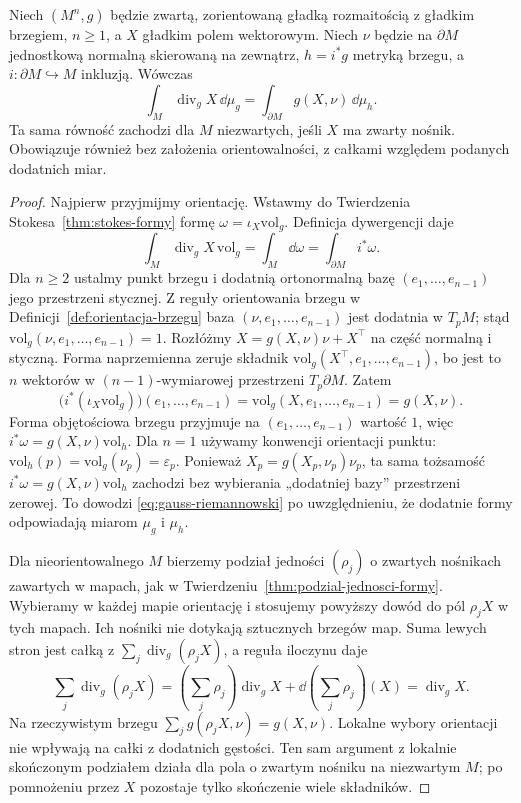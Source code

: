 \begin{twierdzenie}
\label{thm:gauss-riemannowski}
Niech $(M^n,g)$ będzie zwartą, zorientowaną
gładką rozmaitością z gładkim brzegiem,
$n\geq1$, a $X$ gładkim polem wektorowym.
Niech $\nu$ będzie na $\partial M$
jednostkową normalną skierowaną na zewnątrz,
$h=i^*g$ metryką brzegu, a
$i:\partial M\hookrightarrow M$ inkluzją.
Wówczas
\begin{equation}\label{eq:gauss-riemannowski}
 \boxed{\displaystyle
 \int_M\operatorname{div}_gX\,\dd\mu_g
 =\int_{\partial M}g(X,\nu)\,\dd\mu_h.}
\end{equation}
Ta sama równość zachodzi dla $M$ niezwartych,
jeśli $X$ ma zwarty nośnik. Obowiązuje również
bez założenia orientowalności, z całkami względem
podanych dodatnich miar.
\end{twierdzenie}
\begin{proof}
Najpierw przyjmijmy orientację. Wstawmy
do Twierdzenia Stokesa~\ref{thm:stokes-formy}
formę $\omega=\iota_X\mathrm{vol}_g$.
Definicja dywergencji daje
\[
 \int_M\operatorname{div}_gX\,\mathrm{vol}_g
 =\int_M\dd\omega
 =\int_{\partial M}i^*\omega.
\]
Dla $n\geq2$ ustalmy punkt brzegu i dodatnią ortonormalną
bazę $(e_1,\ldots,e_{n-1})$ jego przestrzeni
stycznej. Z reguły orientowania brzegu
w Definicji~\ref{def:orientacja-brzegu}
baza $(\nu,e_1,\ldots,e_{n-1})$ jest
dodatnia w $T_pM$; stąd
$\mathrm{vol}_g(\nu,e_1,\ldots,e_{n-1})=1$.
Rozłóżmy $X=g(X,\nu)\nu+X^\top$ na część
normalną i styczną. Forma naprzemienna
zeruje składnik
$\mathrm{vol}_g(X^\top,e_1,\ldots,e_{n-1})$,
bo jest to $n$ wektorów w $(n-1)$-wymiarowej
przestrzeni $T_p\partial M$. Zatem
\[
 \bigl(i^*(\iota_X\mathrm{vol}_g)\bigr)
      (e_1,\ldots,e_{n-1})
 =\mathrm{vol}_g(X,e_1,\ldots,e_{n-1})
 =g(X,\nu).
\]
Forma objętościowa brzegu przyjmuje
na $(e_1,\ldots,e_{n-1})$ wartość $1$,
więc $i^*\omega=g(X,\nu)\mathrm{vol}_h$.
Dla $n=1$ używamy konwencji orientacji punktu:
$\mathrm{vol}_h(p)=\mathrm{vol}_g(\nu_p)=\varepsilon_p$.
Ponieważ $X_p=g(X_p,\nu_p)\nu_p$, ta sama tożsamość
$i^*\omega=g(X,\nu)\mathrm{vol}_h$ zachodzi bez wybierania
„dodatniej bazy” przestrzeni zerowej.
To dowodzi \eqref{eq:gauss-riemannowski}
po uwzględnieniu, że dodatnie formy
odpowiadają miarom $\mu_g$ i $\mu_h$.

Dla nieorientowalnego $M$ bierzemy podział
jedności $(\rho_j)$ o zwartych nośnikach zawartych w mapach,
jak w Twierdzeniu~\ref{thm:podzial-jednosci-formy}.
Wybieramy w każdej mapie orientację i stosujemy
powyższy dowód do pól $\rho_jX$ w tych mapach.
Ich nośniki nie dotykają sztucznych brzegów map.
Suma lewych stron jest całką z
$\sum_j\operatorname{div}_g(\rho_jX)$,
a reguła iloczynu daje
\[
 \sum_j\operatorname{div}_g(\rho_jX)
 =\left(\sum_j\rho_j\right)\operatorname{div}_gX
  +\dd\!\left(\sum_j\rho_j\right)(X)
 =\operatorname{div}_gX.
\]
Na rzeczywistym brzegu
$\sum_jg(\rho_jX,\nu)=g(X,\nu)$.
Lokalne wybory orientacji nie wpływają
na całki z dodatnich gęstości.
Ten sam argument z lokalnie skończonym
podziałem działa dla pola o zwartym nośniku
na niezwartym $M$; po pomnożeniu przez $X$
pozostaje tylko skończenie wiele składników.
\end{proof}

